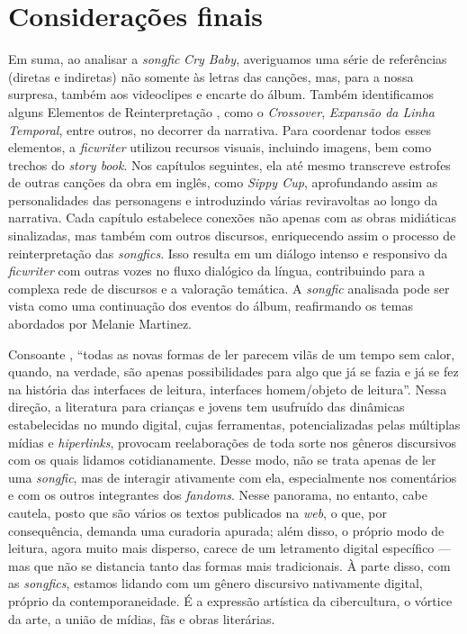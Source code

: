 \section{Considerações finais}\label{sec-considerações}

Em suma, ao analisar a \emph{songfic} \emph{Cry Baby}, averiguamos uma
série de referências (diretas e indiretas) não somente às letras das
canções, mas, para a nossa surpresa, também aos videoclipes e encarte do
álbum. Também identificamos alguns Elementos de Reinterpretação
\cite{jenkins_textual_1992}, como o \emph{Crossover}, \emph{Expansão da Linha
Temporal}, entre outros, no decorrer da narrativa. Para coordenar todos
esses elementos, a \emph{ficwriter} utilizou recursos visuais, incluindo
imagens, bem como trechos do \emph{story book}. Nos capítulos seguintes,
ela até mesmo transcreve estrofes de outras canções da obra em inglês,
como \emph{Sippy Cup}, aprofundando assim as personalidades das
personagens e introduzindo várias reviravoltas ao longo da narrativa.
Cada capítulo estabelece conexões não apenas com as obras midiáticas
sinalizadas, mas também com outros discursos, enriquecendo assim o
processo de reinterpretação das \emph{songfics}. Isso resulta em um
diálogo intenso e responsivo \cite{bakhtin2017} da \emph{ficwriter} com
outras vozes no fluxo dialógico da língua, contribuindo para a complexa
rede de discursos e a valoração temática. A \emph{songfic} analisada
pode ser vista como uma continuação dos eventos do álbum, reafirmando os
temas abordados por Melanie Martinez.

Consoante \textcite[p.~129]{ribeiro_avaliacao_2011}, ``todas as novas formas de ler parecem
vilãs de um tempo sem calor, quando, na verdade, são apenas
possibilidades para algo que já se fazia e já se fez na história das
interfaces de leitura, interfaces homem/objeto de leitura''. Nessa
direção, a literatura para crianças e jovens tem usufruído das dinâmicas
estabelecidas no mundo digital, cujas ferramentas, potencializadas pelas
múltiplas mídias e \emph{hiperlinks}, provocam reelaborações de toda
sorte nos gêneros discursivos com os quais lidamos cotidianamente. Desse
modo, não se trata apenas de ler uma \emph{songfic}, mas de interagir
ativamente com ela, especialmente nos comentários e com os outros
integrantes dos \emph{fandoms}. Nesse panorama, no entanto, cabe
cautela, posto que são vários os textos publicados na \emph{web}, o que,
por consequência, demanda uma curadoria apurada; além disso, o próprio
modo de leitura, agora muito mais disperso, carece de um letramento
digital específico --- mas que não se distancia tanto das formas mais
tradicionais. À parte disso, com as \emph{songfics}, estamos lidando com
um gênero discursivo nativamente digital, próprio da contemporaneidade.
É a expressão artística da cibercultura, o vórtice da arte, a união de
mídias, fãs e obras literárias.


